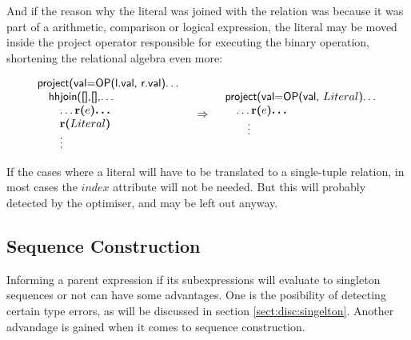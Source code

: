 And if the reason why the literal was joined with the relation was because it was part of a arithmetic, comparison
or logical expression, the literal may be moved inside the \textsf{project} operator responsible for executing the
binary operation, shortening the relational algebra even more:

\begin{equation}
\begin{array}{lcr}
\begin{array}{l}
\mbox{\textsf{project(val=OP(l.val, r.val)\ldots}} \\ \quad
\mbox{\textsf{hhjoin([],[],\ldots}} \\ \quad \quad
\mbox{\textsf{\ldots}\textbf{r(}}e\mbox{\textbf{)\ldots}} \\ \quad \quad
\mbox{\textbf{r(}}Literal\mbox{\textbf{)}} \\
\mbox{\quad\quad\textsf{\vdots}}
\end{array}
&
\Rightarrow
&
\begin{array}{l}
\mbox{\textsf{project(val=OP(val, }}Literal\mbox{\textsf{)\ldots}} \\ \quad
\mbox{\textsf{\ldots}\textbf{r(}}e\mbox{\textbf{)\ldots}} \\
\mbox{\quad\quad\textsf{\vdots}}
\end{array}
\end{array}
\label{simpl:trans:TD:binLit}
\end{equation}

If the cases where a literal will have to be translated to a single-tuple relation, in most cases the $index$
attribute will not be needed. But this will probably detected by the optimiser, and may be left out anyway.

\subsection{Sequence Construction}
\label{sect:trans:TD:simpl:seq}

Informing a parent expression if its subexpressions will evaluate to singleton sequences or not can have some
advantages. One is the posibility of detecting certain type errors, as will be discussed in section
\ref{sect:disc:singelton}. Another advandage is gained when it comes to sequence construction.


